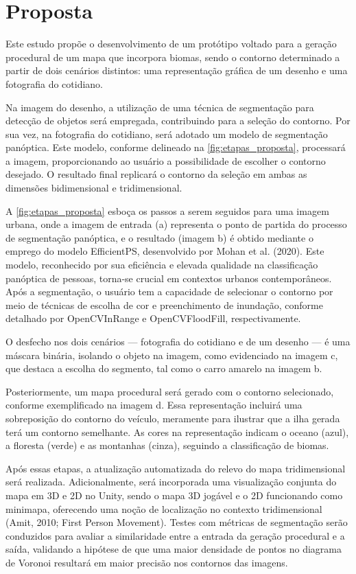 \section{Proposta}

Este estudo propõe o desenvolvimento de um protótipo voltado para a geração procedural de um mapa que incorpora biomas, sendo o contorno determinado a partir de dois cenários distintos: uma representação gráfica de um desenho e uma fotografia do cotidiano.

Na imagem do desenho, a utilização de uma técnica de segmentação para detecção de objetos será empregada, contribuindo para a seleção do contorno. Por sua vez, na fotografia do cotidiano, será adotado um modelo de segmentação panóptica. Este modelo, conforme delineado na \cref{fig:etapas_proposta}, processará a imagem, proporcionando ao usuário a possibilidade de escolher o contorno desejado. O resultado final replicará o contorno da seleção em ambas as dimensões bidimensional e tridimensional.

A \cref{fig:etapas_proposta} esboça os passos a serem seguidos para uma imagem urbana, onde a imagem de entrada (a) representa o ponto de partida do processo de segmentação panóptica, e o resultado (imagem b) é obtido mediante o emprego do modelo EfficientPS, desenvolvido por Mohan et al. (2020). Este modelo, reconhecido por sua eficiência e elevada qualidade na classificação panóptica de pessoas, torna-se crucial em contextos urbanos contemporâneos. Após a segmentação, o usuário tem a capacidade de selecionar o contorno por meio de técnicas de escolha de cor e preenchimento de inundação, conforme detalhado por OpenCVInRange e OpenCVFloodFill, respectivamente.

O desfecho nos dois cenários — fotografia do cotidiano e de um desenho — é uma máscara binária, isolando o objeto na imagem, como evidenciado na imagem c, que destaca a escolha do segmento, tal como o carro amarelo na imagem b.

Posteriormente, um mapa procedural será gerado com o contorno selecionado, conforme exemplificado na imagem d. Essa representação incluirá uma sobreposição do contorno do veículo, meramente para ilustrar que a ilha gerada terá um contorno semelhante. As cores na representação indicam o oceano (azul), a floresta (verde) e as montanhas (cinza), seguindo a classificação de biomas.

Após essas etapas, a atualização automatizada do relevo do mapa tridimensional será realizada. Adicionalmente, será incorporada uma visualização conjunta do mapa em 3D e 2D no Unity, sendo o mapa 3D jogável e o 2D funcionando como minimapa, oferecendo uma noção de localização no contexto tridimensional (Amit, 2010; First Person Movement). Testes com métricas de segmentação serão conduzidos para avaliar a similaridade entre a entrada da geração procedural e a saída, validando a hipótese de que uma maior densidade de pontos no diagrama de Voronoi resultará em maior precisão nos contornos das imagens.

